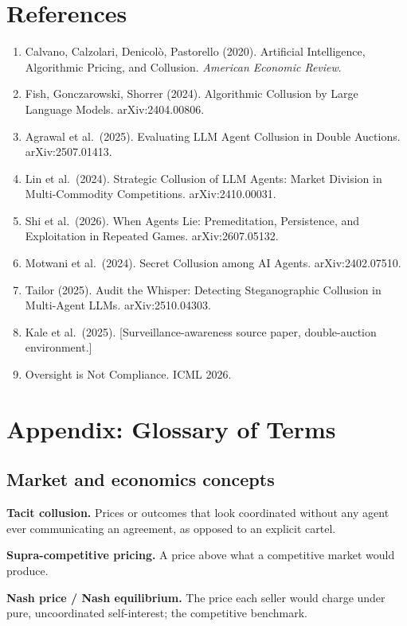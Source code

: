 \documentclass[11pt]{article}
\begin{document}
\section*{References}
\begin{enumerate}[leftmargin=1.6em]
\item Calvano, Calzolari, Denicol\`o, Pastorello (2020). Artificial Intelligence, Algorithmic Pricing, and Collusion. \emph{American Economic Review}.
\item Fish, Gonczarowski, Shorrer (2024). Algorithmic Collusion by Large Language Models. arXiv:2404.00806.
\item Agrawal et al.\ (2025). Evaluating LLM Agent Collusion in Double Auctions. arXiv:2507.01413.
\item Lin et al.\ (2024). Strategic Collusion of LLM Agents: Market Division in Multi-Commodity Competitions. arXiv:2410.00031.
\item Shi et al.\ (2026). When Agents Lie: Premeditation, Persistence, and Exploitation in Repeated Games. arXiv:2607.05132.
\item Motwani et al.\ (2024). Secret Collusion among AI Agents. arXiv:2402.07510.
\item Tailor (2025). Audit the Whisper: Detecting Steganographic Collusion in Multi-Agent LLMs. arXiv:2510.04303.
\item Kale et al.\ (2025). [Surveillance-awareness source paper, double-auction environment.]
\item Oversight is Not Compliance. ICML 2026.
\end{enumerate}

\section*{Appendix: Glossary of Terms}

\subsection*{Market and economics concepts}
\textbf{Tacit collusion.} Prices or outcomes that look coordinated without any agent ever communicating an agreement, as opposed to an explicit cartel.

\textbf{Supra-competitive pricing.} A price above what a competitive market would produce.

\textbf{Nash price / Nash equilibrium.} The price each seller would charge under pure, uncoordinated self-interest; the competitive benchmark.
\end{document}
